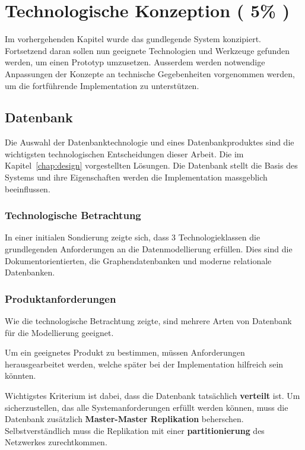\chapter{Technologische Konzeption ( 5\% )}


Im vorhergehenden Kapitel wurde das gundlegende System konzipiert.
Fortsetzend daran sollen nun geeignete Technologien und Werkzeuge gefunden werden,
um einen Prototyp umzusetzen.
Ausserdem werden notwendige Anpassungen der Konzepte an technische Gegebenheiten vorgenommen werden,
um die fortf\"uhrende Implementation zu unterst\"utzen.





\section{Datenbank}

Die Auswahl der Datenbanktechnologie und eines Datenbankproduktes sind die wichtigsten technologischen Entscheidungen dieser Arbeit.
Die im Kapitel~\ref{chap:design} vorgestellten L\"osungen.
Die Datenbank stellt die Basis des Systems und ihre Eigenschaften werden die Implementation massgeblich beeinflussen.


\subsection{Technologische Betrachtung}

In einer initialen Sondierung zeigte sich,
dass 3 Technologieklassen die grundlegenden Anforderungen an die Datenmodellierung erf\"ullen.
Dies sind die Dokumentorientierten, die Graphendatenbanken und moderne relationale Datenbanken.

\subsection{Produktanforderungen}

Wie die technologische Betrachtung zeigte,
sind mehrere Arten von Datenbank f\"ur die Modellierung geeignet.

Um ein geeignetes Produkt zu bestimmen,
m\"ussen Anforderungen herausgearbeitet werden,
welche sp\"ater bei der Implementation hilfreich sein k\"onnten.

Wichtigstes Kriterium ist dabei, dass die Datenbank tats\"achlich \textbf{verteilt} ist.
Um sicherzustellen, das alle Systemanforderungen erf\"ullt werden k\"onnen,
muss die Datenbank zus\"atzlich \textbf{Master-Master Replikation} beherschen.
Selbstverst\"andlich muss die Replikation mit einer \textbf{partitionierung} des Netzwerkes zurechtkommen.

